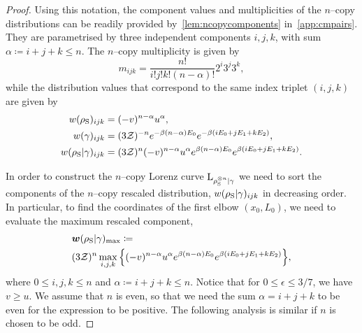 \documentclass[pra,
aps,
twocolumn,
superscriptaddress,
groupedaddress,
nofootinbib,
reprint
]{revtex4-1}
\begin{document}
\begin{proof}
Using this notation, the component values and multiplicities of the $n$--copy distributions can be readily provided by~\cref{lem:ncopycomponents} in~\cref{app:cmpairs}.
They are parametrised by three independent components $i,j,k$, with sum $\alpha \coloneqq i+j+k \leq n$.
The $n$--copy multiplicity is given by
\begin{equation}
	m_{ijk} = \frac{n!}{i!j!k!(n-\alpha)!} 2^i 3^j 3^k,
\end{equation}
while the distribution values that correspond to the same index triplet $(i,j,k)$ are given by
\begin{align}
	w(\rho_{\rm{S}})_{ijk} &= (-v)^{n-\alpha} u^{\alpha}, \\
	w(\gamma)_{ijk} &= (3\mathcal{Z})^{-n} e^{-\beta (n-\alpha)E_0} e^{-\beta ( i E_0 + j E_1 + k E_2 )}, \\
	w(\rho_{\rm{S}} | \gamma)_{ijk} &= (3\mathcal{Z})^{n} (-v)^{n-\alpha} u^{\alpha} e^{\beta (n-\alpha)E_0} e^{\beta ( i E_0 + j E_1 + k E_2 )}.
\end{align}

In order to construct the $n$--copy Lorenz curve ${{\rm{L}}_{\rho_{\rm{S}}^{\otimes n}|\gamma}}$ we need to sort the components of the $n$--copy rescaled distribution, $w(\rho_{\rm{S}} | \gamma)_{ijk}$ in decreasing order.
In particular, to find the coordinates of the first elbow $(x_0, L_0)$, we need to evaluate the maximum rescaled component,
\begin{align}
	&\bm{w}(\rho_{\rm{S}} | \gamma)_{\rm{max}} \coloneqq \label{eq:max_slope}\\
	&(3\mathcal{Z})^{n} \max\limits_{i,j,k}\Big\{ (-v)^{n-\alpha} u^{\alpha} e^{\beta (n-\alpha)E_0} e^{\beta ( i E_0 + j E_1 + k E_2 )} \Big\}, \nonumber
\end{align}
where $0 \leq i,j,k \leq n$ and $\alpha \coloneqq i+j+k \leq n$.
Notice that for $0 \leq \epsilon \leq 3/7$, we have $v \geq u$. 
We assume that $n$ is even, so that we need the sum $\alpha = i+j+k$ to be even for the expression to be positive. 
The following analysis is similar if $n$ is chosen to be odd.


\end{proof}
\end{document}
